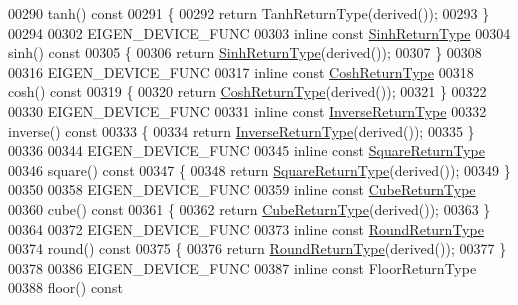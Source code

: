 \begin{DoxyCode}
00290 tanh()\textcolor{keyword}{ const}
00291 \textcolor{keyword}{}\{
00292   \textcolor{keywordflow}{return} TanhReturnType(derived());
00293 \}
00294 
00302 EIGEN\_DEVICE\_FUNC
00303 \textcolor{keyword}{inline} \textcolor{keyword}{const} \hyperlink{group___core___module_class_eigen_1_1_cwise_unary_op}{SinhReturnType}
00304 sinh()\textcolor{keyword}{ const}
00305 \textcolor{keyword}{}\{
00306   \textcolor{keywordflow}{return} \hyperlink{group___core___module_class_eigen_1_1_cwise_unary_op}{SinhReturnType}(derived());
00307 \}
00308 
00316 EIGEN\_DEVICE\_FUNC
00317 \textcolor{keyword}{inline} \textcolor{keyword}{const} \hyperlink{group___core___module_class_eigen_1_1_cwise_unary_op}{CoshReturnType}
00318 cosh()\textcolor{keyword}{ const}
00319 \textcolor{keyword}{}\{
00320   \textcolor{keywordflow}{return} \hyperlink{group___core___module_class_eigen_1_1_cwise_unary_op}{CoshReturnType}(derived());
00321 \}
00322 
00330 EIGEN\_DEVICE\_FUNC
00331 \textcolor{keyword}{inline} \textcolor{keyword}{const} \hyperlink{group___core___module_class_eigen_1_1_cwise_unary_op}{InverseReturnType}
00332 inverse()\textcolor{keyword}{ const}
00333 \textcolor{keyword}{}\{
00334   \textcolor{keywordflow}{return} \hyperlink{group___core___module_class_eigen_1_1_cwise_unary_op}{InverseReturnType}(derived());
00335 \}
00336 
00344 EIGEN\_DEVICE\_FUNC
00345 \textcolor{keyword}{inline} \textcolor{keyword}{const} \hyperlink{group___core___module_class_eigen_1_1_cwise_unary_op}{SquareReturnType}
00346 square()\textcolor{keyword}{ const}
00347 \textcolor{keyword}{}\{
00348   \textcolor{keywordflow}{return} \hyperlink{group___core___module_class_eigen_1_1_cwise_unary_op}{SquareReturnType}(derived());
00349 \}
00350 
00358 EIGEN\_DEVICE\_FUNC
00359 \textcolor{keyword}{inline} \textcolor{keyword}{const} \hyperlink{group___core___module_class_eigen_1_1_cwise_unary_op}{CubeReturnType}
00360 cube()\textcolor{keyword}{ const}
00361 \textcolor{keyword}{}\{
00362   \textcolor{keywordflow}{return} \hyperlink{group___core___module_class_eigen_1_1_cwise_unary_op}{CubeReturnType}(derived());
00363 \}
00364 
00372 EIGEN\_DEVICE\_FUNC
00373 \textcolor{keyword}{inline} \textcolor{keyword}{const} \hyperlink{group___core___module_class_eigen_1_1_cwise_unary_op}{RoundReturnType}
00374 round()\textcolor{keyword}{ const}
00375 \textcolor{keyword}{}\{
00376   \textcolor{keywordflow}{return} \hyperlink{group___core___module_class_eigen_1_1_cwise_unary_op}{RoundReturnType}(derived());
00377 \}
00378 
00386 EIGEN\_DEVICE\_FUNC
00387 \textcolor{keyword}{inline} \textcolor{keyword}{const} FloorReturnType
00388 floor()\textcolor{keyword}{ const}

\end{DoxyCode}
